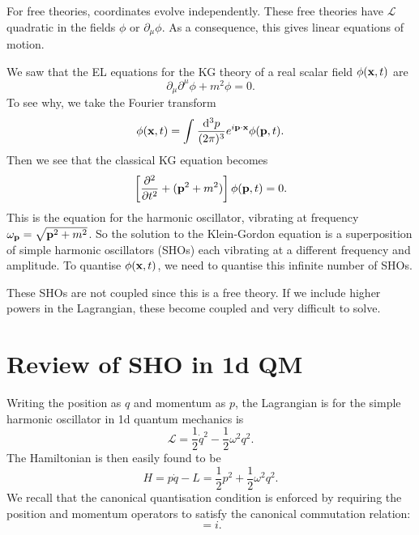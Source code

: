 For free theories, coordinates evolve independently. These free theories have $\mathcal{L}$ quadratic in the fields $\phi$ or $\partial_\mu \phi$. As a consequence, this gives linear equations of motion.

\begin{example}
  We saw that the EL equations for the KG theory of a real scalar field $\phi(\vb{x}, t)$ are
  \begin{equation}
    \partial_\mu \partial^\mu \phi + m^2 \phi = 0.
  \end{equation}
  To see why, we take the Fourier transform
  \begin{equation}
    \phi(\vb{x}, t) = \int_{}^{} \frac{\dd[3]{p} 
  }{(2\pi)^3} e^{i \vb{p} \cdot \vb{x}} \phi(\vb{p}, t) .
  \end{equation}
  Then we see that the classical KG equation becomes
  \begin{equation}
    \left[\pdv[2]{}{t} + (\vb{p}^2 + m^2)\right] \phi(\vb{p}, t) = 0.
  \end{equation}
  This is the equation for the harmonic oscillator, vibrating at frequency $\omega_{\vb{p}} = \sqrt{\vb{p}^2 + m^2}$.
  So the solution to the Klein-Gordon equation is a superposition of simple harmonic oscillators (SHOs) each vibrating at a different frequency and amplitude. To quantise $\phi(\vb{x}, t)$, we need to quantise this infinite number of SHOs.
  \begin{leftbar}
    \begin{remark}
      These SHOs are not coupled since this is a free theory. If we include higher powers in the Lagrangian, these become coupled and very difficult to solve.
    \end{remark}
  \end{leftbar}
\end{example}

\section{Review of SHO in 1d QM}%
\label{sec:review_of_sho_in_1d_qm}

Writing the position as $q$ and momentum as $p$, the Lagrangian is for the simple harmonic oscillator in 1d quantum mechanics is
\begin{equation}
  \mathcal{L} = \frac{1}{2}\dot q^2 - \frac{1}{2} \omega^2 q^2.
\end{equation}
The Hamiltonian is then easily found to be
\begin{equation}
  H = p \dot q - L = \frac{1}{2}p^2 + \frac{1}{2} \omega^2 q^2.
\end{equation}
We recall that the canonical quantisation condition is enforced by requiring the position and momentum operators to satisfy the canonical commutation relation:
\begin{equation}
  [q, p] = i.
\end{equation}


